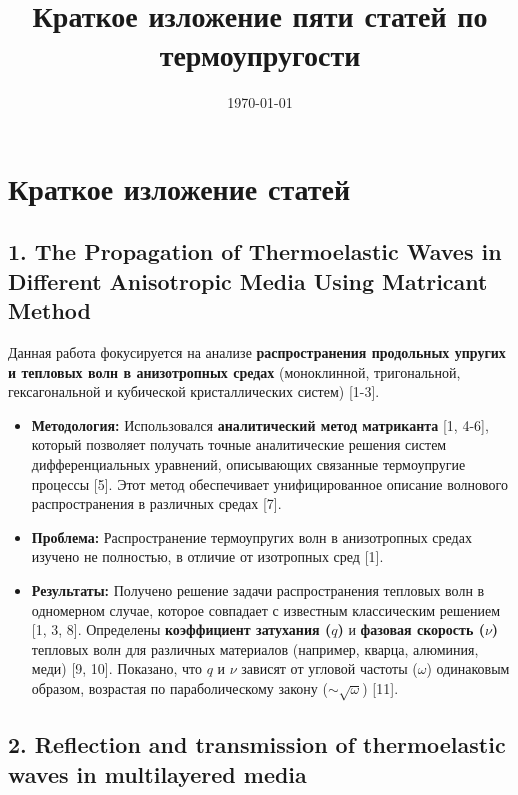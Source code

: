 \documentclass{article}
\title{Краткое изложение пяти статей по термоупругости}
\date{\today}
\begin{document}
\maketitle
\tableofcontents

\section*{Краткое изложение статей}

\subsection*{1. The Propagation of Thermoelastic Waves in Different Anisotropic Media Using Matricant Method}

Данная работа фокусируется на анализе \textbf{распространения продольных упругих и тепловых волн в анизотропных средах} (моноклинной, тригональной, гексагональной и кубической кристаллических систем) [1-3].
\begin{itemize}
    \item \textbf{Методология:} Использовался \textbf{аналитический метод матриканта} [1, 4-6], который позволяет получать точные аналитические решения систем дифференциальных уравнений, описывающих связанные термоупругие процессы [5]. Этот метод обеспечивает унифицированное описание волнового распространения в различных средах [7].
    \item \textbf{Проблема:} Распространение термоупругих волн в анизотропных средах изучено не полностью, в отличие от изотропных сред [1].
    \item \textbf{Результаты:} Получено решение задачи распространения тепловых волн в одномерном случае, которое совпадает с известным классическим решением [1, 3, 8]. Определены \textbf{коэффициент затухания ($q$)} и \textbf{фазовая скорость ($\nu$)} тепловых волн для различных материалов (например, кварца, алюминия, меди) [9, 10]. Показано, что $q$ и $\nu$ зависят от угловой частоты ($\omega$) одинаковым образом, возрастая по параболическому закону ($\sim \sqrt{\omega}$) [11].
\end{itemize}

\subsection*{2. Reflection and transmission of thermoelastic waves in multilayered media}
\end{document}
